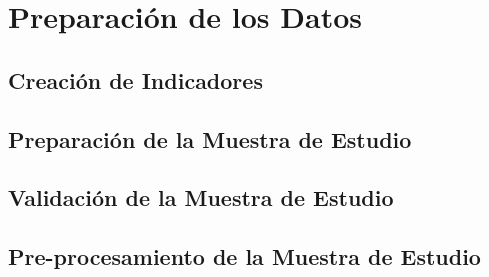 \section{Preparación de los Datos}
\subsection{Creación de Indicadores}
\subsection{Preparación de la Muestra de Estudio}
\subsection{Validación de la Muestra de Estudio}
\subsection{Pre-procesamiento de la Muestra de Estudio}